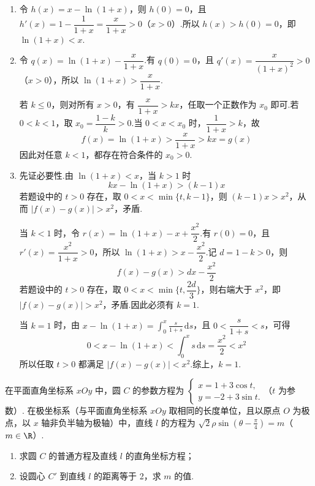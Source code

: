\begin{solution}
\begin{enumerate}
\item 令 \(h(x)=x-\ln(1+x)\)，则 \(h(0)=0\)，且
\(h'(x)=1-\dfrac1{1+x}=\dfrac{x}{1+x}>0\)（\(x>0\)）.所以 \(h(x)>h(0)=0\)，即 \(\ln(1+x)<x\).

\item 令 \(q(x)=\ln(1+x)-\dfrac{x}{1+x}\).有 \(q(0)=0\)，且
\(q'(x)=\dfrac{x}{(1+x)^2}>0\)（\(x>0\)），所以 \(\ln(1+x)>\dfrac{x}{1+x}\).

若 \(k\leqslant0\)，则对所有 \(x>0\)，有 \(\dfrac{x}{1+x}>kx\)，任取一个正数作为 \(x_0\) 即可.若 \(0<k<1\)，取 \(x_0=\dfrac{1-k}{k}>0\).当 \(0<x<x_0\) 时，\(\dfrac1{1+x}>k\)，故
\[
f(x)=\ln(1+x)>\frac{x}{1+x}>kx=g(x)
\]
因此对任意 \(k<1\)，都存在符合条件的 \(x_0>0\).

\item 先证必要性.由 \(\ln(1+x)<x\)，当 \(k>1\) 时
\[
kx-\ln(1+x)>(k-1)x
\]
若题设中的 \(t>0\) 存在，取 \(0<x<\min\{t,k-1\}\)，则 \((k-1)x>x^2\)，从而 \(|f(x)-g(x)|>x^2\)，矛盾.

当 \(k<1\) 时，令
\(r(x)=\ln(1+x)-x+\dfrac{x^2}{2}\).有 \(r(0)=0\)，且
\(r'(x)=\dfrac{x^2}{1+x}>0\)，所以 \(\ln(1+x)>x-\dfrac{x^2}{2}\).记 \(d=1-k>0\)，则
\[
f(x)-g(x)>dx-\frac{x^2}{2}
\]
若题设中的 \(t>0\) 存在，取 \(0<x<\min\{t,\dfrac{2d}{3}\}\)，则右端大于 \(x^2\)，即 \(|f(x)-g(x)|>x^2\)，矛盾.因此必须有 \(k=1\).

当 \(k=1\) 时，由
\(x-\ln(1+x)=\displaystyle\int_0^x\frac{s}{1+s}\,\mathrm{d}s\)，且 \(0<\dfrac{s}{1+s}<s\)，可得
\[
0<x-\ln(1+x)<\int_0^x s\,\mathrm{d}s=\frac{x^2}{2}<x^2
\]
所以任取 \(t>0\) 都满足 \(|f(x)-g(x)|<x^2\).综上，\(k=1\).
\end{enumerate}
\end{solution}

\begin{problem}
在平面直角坐标系 \(xOy\) 中，圆 \(C\) 的参数方程为 \(\begin{cases}
x = 1 + 3\cos t,\\
y = -2 + 3\sin t.
\end{cases}\)（\(t\) 为参数）. 在极坐标系（与平面直角坐标系 \(xOy\) 取相同的长度单位，且以原点 \(O\) 为极点，以 \(x\) 轴非负半轴为极轴）中，直线 \(l\) 的方程为 \(\sqrt{2}\rho\sin \left(\theta - \frac{\pi}{4}\right) = m\)（\(m \in \R\)）.
\begin{enumerate}
\item 求圆 \(C\) 的普通方程及直线 \(l\) 的直角坐标方程；
\item 设圆心 \(C'\) 到直线 \(l\) 的距离等于 2，求 \(m\) 的值.
\end{enumerate}
\end{problem}

